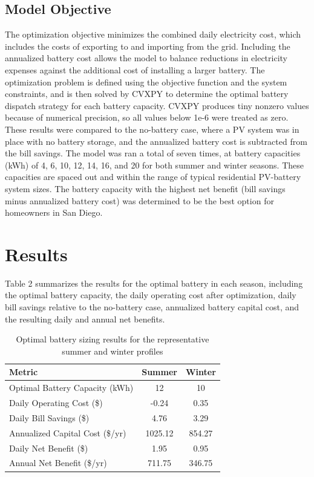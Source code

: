\documentclass[14pt, final,numbered]{ifacconf}
\begin{document}
\subsection{Model Objective}
The optimization objective minimizes the combined daily electricity cost, which includes the costs of exporting to and importing from the grid. Including the annualized battery cost allows the model to balance reductions in electricity expenses against the additional cost of installing a larger battery. The optimization problem is defined using the objective function and the system constraints, and is then solved by CVXPY to determine the optimal battery dispatch strategy for each battery capacity. CVXPY produces tiny nonzero values because of numerical precision, so all values below 1e-6 were treated as zero. These results were compared to the no-battery case, where a PV system was in place with no battery storage, and the annualized battery cost is subtracted from the bill savings. The model was ran a total of seven times, at battery capacities (kWh) of 4, 6, 10, 12, 14, 16, and 20 for both summer and winter seasons. These capacities are spaced out and within the range of typical residential PV-battery system sizes. The battery capacity with the highest net benefit (bill savings minus annualized battery cost) was determined to be the best option for homeowners in San Diego. 

\section{Results}
Table 2 summarizes the results for the optimal battery in each season, including the optimal battery capacity, the daily operating cost after optimization, daily bill savings relative to the no-battery case, annualized battery capital cost, and the resulting daily and annual net benefits.

\begin{table}[H]
\centering
\caption{Optimal battery sizing results for the representative summer and winter profiles}
\label{tab:battery_results}
\begin{tabular}{lcc}
\toprule
\textbf{Metric} & \textbf{Summer} & \textbf{Winter} \\
\midrule
Optimal Battery Capacity (kWh) & 12 & 10 \\
Daily Operating Cost (\$) & -0.24 & 0.35 \\
Daily Bill Savings (\$) & 4.76 & 3.29 \\
Annualized Capital Cost (\$/yr) & 1025.12 & 854.27 \\
Daily Net Benefit (\$) & 1.95 & 0.95 \\
Annual Net Benefit (\$/yr) & 711.75 & 346.75 \\
\bottomrule
\end{tabular}
\end{table}
\end{document}
